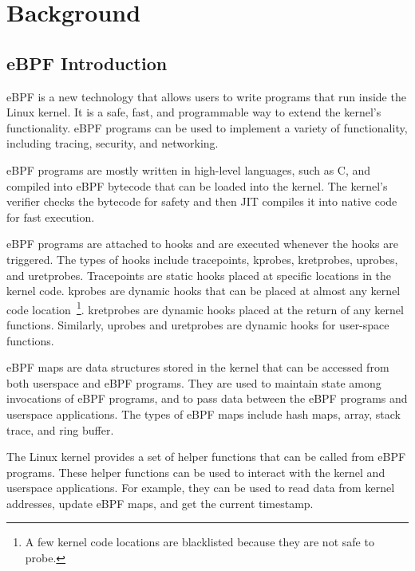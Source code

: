 \section{Background}

\subsection{eBPF Introduction}
eBPF is a new technology that allows users to write programs that run inside the Linux kernel. It is a safe, fast, and programmable way to extend the kernel's functionality. eBPF programs can be used to implement a variety of functionality, including tracing, security, and networking.


eBPF programs are mostly written in high-level languages, such as C, and compiled into eBPF bytecode that can be loaded into the kernel.
The kernel's verifier checks the bytecode for safety and then JIT compiles it into native code for fast execution.

eBPF programs are attached to hooks and are executed whenever the hooks are triggered. 
The types of hooks include tracepoints, kprobes, kretprobes, uprobes, and uretprobes.
Tracepoints are static hooks placed at specific locations in the kernel code.
kprobes are dynamic hooks that can be placed at almost any kernel code location~\footnote{A few kernel code locations are blacklisted because they are not safe to probe.}.
kretprobes are dynamic hooks placed at the return of any kernel functions.
Similarly, uprobes and uretprobes are dynamic hooks for user-space functions.



eBPF maps are data structures stored in the kernel that can be accessed from both userspace and eBPF programs.
They are used to maintain state among invocations of eBPF programs, and to pass data between the eBPF programs and userspace applications. 
The types of eBPF maps include hash maps, array, stack trace, and ring buffer.

The Linux kernel provides a set of helper functions that can be called from eBPF programs. 
These helper functions can be used to interact with the kernel and userspace applications.
For example, they can be used to read data from kernel addresses, update eBPF maps, and get the current timestamp.



